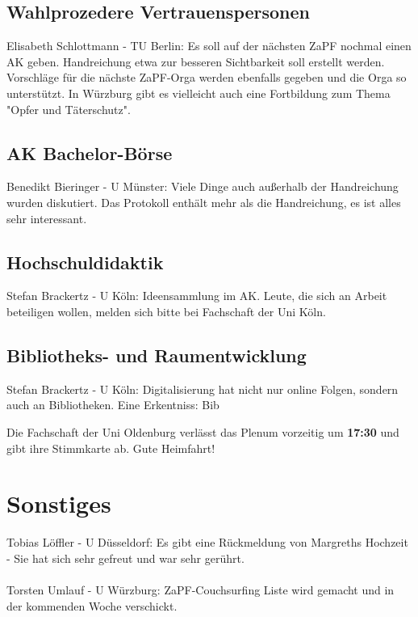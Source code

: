 \tocless  \subsection{Wahlprozedere Vertrauenspersonen}
    Elisabeth Schlottmann - TU Berlin:  Es soll auf der nächsten ZaPF nochmal einen AK geben.
    Handreichung etwa zur besseren Sichtbarkeit soll erstellt werden.
    Vorschläge für die nächste ZaPF-Orga werden ebenfalls gegeben und die Orga so unterstützt.
    In Würzburg gibt es vielleicht auch eine Fortbildung zum Thema "Opfer und Täterschutz".

\tocless  \subsection{AK Bachelor-Börse}
    Benedikt Bieringer - U Münster:  Viele Dinge auch außerhalb der Handreichung wurden diskutiert.
    Das Protokoll enthält mehr als die Handreichung, es ist alles sehr interessant.

\tocless  \subsection{Hochschuldidaktik}
    Stefan Brackertz - U Köln:  Ideensammlung im AK. Leute, die sich an Arbeit beteiligen wollen, melden sich bitte bei Fachschaft der Uni Köln.

\tocless  \subsection{Bibliotheks- und Raumentwicklung}
    Stefan Brackertz - U Köln:  Digitalisierung hat nicht nur online Folgen, sondern auch an Bibliotheken. Eine Erkentniss: Bib

  \begin{info}{}
    Die Fachschaft der Uni Oldenburg verlässt das Plenum vorzeitig um \textbf{17:30} und gibt ihre Stimmkarte ab. Gute Heimfahrt!
  \end{info}

\section{Sonstiges}
    Tobias Löffler - U Düsseldorf:  Es gibt eine Rückmeldung von Margreths Hochzeit - Sie hat sich sehr gefreut und war sehr gerührt. \\ \\

    Torsten Umlauf - U Würzburg:  ZaPF-Couchsurfing Liste wird gemacht und in der kommenden Woche verschickt.

